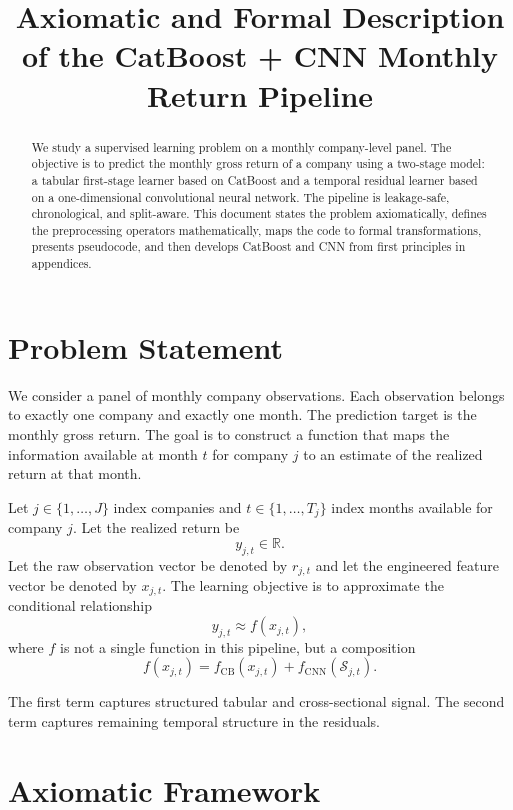 \documentclass[11pt]{article}
\title{Axiomatic and Formal Description of the CatBoost + CNN Monthly Return Pipeline}
\author{ }
\date{ }
\newcommand{\R}{\mathbb{R}}
\newcommand{\1}{\mathbf{1}}
\newcommand{\seq}{\mathcal{S}}
\begin{document}
\maketitle

\begin{abstract}
We study a supervised learning problem on a monthly company-level panel. The objective is to predict the monthly gross return of a company using a two-stage model: a tabular first-stage learner based on CatBoost and a temporal residual learner based on a one-dimensional convolutional neural network. The pipeline is leakage-safe, chronological, and split-aware. This document states the problem axiomatically, defines the preprocessing operators mathematically, maps the code to formal transformations, presents pseudocode, and then develops CatBoost and CNN from first principles in appendices.
\end{abstract}

\tableofcontents
\newpage

\section{Problem Statement}

We consider a panel of monthly company observations. Each observation belongs to exactly one company and exactly one month. The prediction target is the monthly gross return. The goal is to construct a function that maps the information available at month $t$ for company $j$ to an estimate of the realized return at that month.

Let $j \in \{1,\dots,J\}$ index companies and $t \in \{1,\dots,T_j\}$ index months available for company $j$. Let the realized return be
\[
y_{j,t} \in \R.
\]
Let the raw observation vector be denoted by $r_{j,t}$ and let the engineered feature vector be denoted by $x_{j,t}$. The learning objective is to approximate the conditional relationship
\[
y_{j,t} \approx f(x_{j,t}),
\]
where $f$ is not a single function in this pipeline, but a composition
\[
f(x_{j,t}) = f_{\mathrm{CB}}(x_{j,t}) + f_{\mathrm{CNN}}(\seq_{j,t}).
\]

The first term captures structured tabular and cross-sectional signal. The second term captures remaining temporal structure in the residuals.

\section{Axiomatic Framework}
\end{document}
